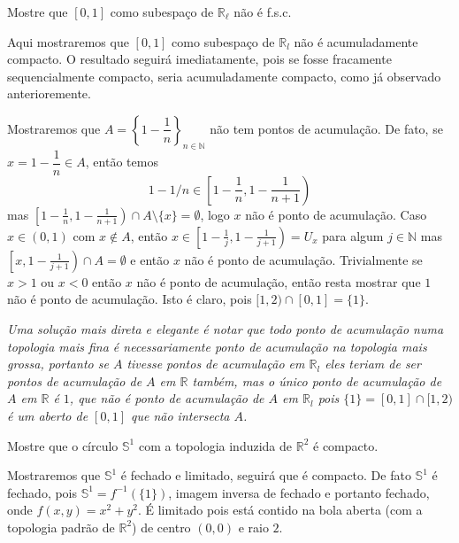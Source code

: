\begin{Mybox}
Mostre que $[0, 1]$ como subespaço de $\mathbb{R}_{\ell}$ não é f.s.c.
\vspace{-.4cm}
\end{Mybox}
\vspace{-.5cm}
\begin{dem}
Aqui mostraremos que $[0,1]$ como subespaço de $\mathbb{R}_l$ não é acumuladamente compacto. O resultado seguirá imediatamente, pois se fosse fracamente sequencialmente compacto, seria acumuladamente compacto, como já observado anterioremente. \par 
    Mostraremos que $A = \left\{1 - \dfrac{1}{n} \right\}_{n \in \mathbb{N}}$ não tem pontos de acumulação. De fato, se $x = 1 - \dfrac{1}{n} \in A$, então temos $$1 - 1 / n \in \left[ 1 - \frac { 1 } { n } , 1 - \frac { 1 } { n + 1 } \right)$$ mas $\left[ 1 - \frac { 1 } { n } , 1 - \frac { 1 } { n + 1 } \right) \cap A \setminus \{x\} = \emptyset$, logo $x$ não é ponto de acumulação. Caso $x \in (0,1)$ com $x \notin A$, então $x \in \left[ 1 - \frac { 1 } { j } , 1 - \frac { 1 } { j + 1 } \right) = U _ { x }$ para algum $j \in \mathbb{N}$ mas $\left[x, 1 - \frac{1}{j+1} \right) \cap A = \emptyset $ e então $x$ não é ponto de acumulação. Trivialmente se $x > 1$ ou $x <0$ então $x$ não é ponto de acumulação, então resta mostrar que $1$ não é ponto de acumulação. Isto é claro, pois $[1, 2) \cap [0,1] = \{ 1 \}$.
    \begin{oobs}
    \textit{Uma solução mais direta e elegante é notar que todo ponto de acumulação numa topologia mais fina é necessariamente ponto de acumulação na topologia mais grossa, portanto se $A$ tivesse pontos de acumulação em $\mathbb{R}_l$ eles teriam de ser pontos de acumulação de $A$ em $\mathbb{R}$ também, mas o único ponto de acumulação de $A$ em $\mathbb{R}$ é $1$, que não é ponto de acumulação de $A$ em $\mathbb{R}_l$ pois $\{ 1 \} = [0, 1] \cap [1, 2)$ é um aberto de $[0,1]$ que não intersecta $A$.}
    \end{oobs}
\end{dem}

\begin{Mybox}
Mostre que o círculo $\mathbb{S}^1$ com a topologia induzida de $\mathbb{R}^2$ é compacto. 
\vspace{-.4cm}
\end{Mybox}
\vspace{-.5cm}
\begin{dem}
Mostraremos que $\mathbb{S}^1$ é fechado e limitado, seguirá que é compacto. De fato $\mathbb{S}^1$ é fechado, pois $\mathbb{S}^1 = f^{-1}(\{1\})$, imagem inversa de fechado e portanto fechado, onde $f(x, y) = x^2 + y^2$. É limitado pois está contido na bola aberta (com a topologia padrão de $\mathbb{R}^2$) de centro $(0,0)$ e raio $2$.
\end{dem}



